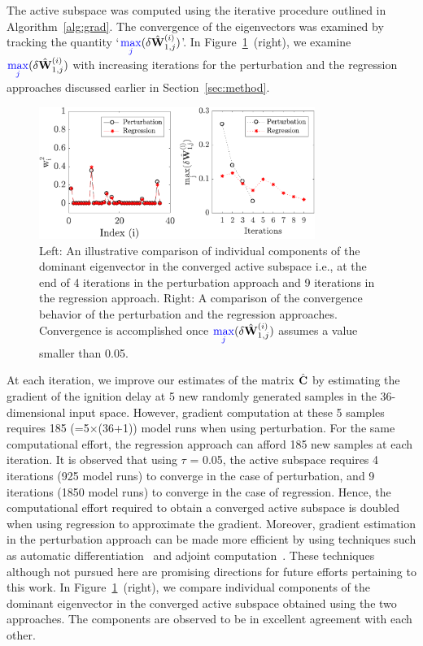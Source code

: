 The active subspace was computed using the iterative procedure outlined in 
Algorithm~\ref{alg:grad}. The convergence of the eigenvectors was examined
by tracking the quantity `${\color{blue}{\max\limits_j}}(\delta \hat{\mathbf{{W}}}_{1,j}^{(i)})$'. 
In Figure~\ref{fig:conv_app}~(right), we examine ${\color{blue}{\max\limits_j}}(\delta \hat{\mathbf{{W}}}_{1,j}^{(i)})$
with increasing iterations for the perturbation and the regression approaches 
discussed earlier in Section~\ref{sec:method}. 
%
\begin{figure}[htbp]
 \begin{center}
  \includegraphics[width=0.8\textwidth]{./Figures/eig_conv36Dp2}
\caption{Left: An illustrative comparison of individual components of the 
dominant eigenvector in the converged active subspace i.e., at the end
of 4 iterations in the perturbation approach and 9 iterations in the
regression approach. Right: A comparison of the convergence behavior
of the perturbation and the
regression approaches. Convergence is accomplished once 
${\color{blue}{\max\limits_j}}(\delta \hat{\mathbf{{W}}}_{1,j}^{(i)})$ assumes a value smaller
than 0.05.}
\label{fig:conv_app}
\end{center}
\end{figure}
%
At each iteration, we improve our estimates of the matrix $\hat{\mathbf{{C}}}$ by
estimating the gradient of the ignition delay at 5 new randomly generated samples 
in the 36-dimensional input space. However, gradient computation at these
5 samples requires 185 (=5$\times$(36+1)) model runs when using perturbation. 
For the same computational effort, the regression approach can afford 185 new
samples at each iteration. It is observed that using $\tau$ = 0.05, the 
active subspace requires 4 iterations (925 model runs) to converge in the case of perturbation, and
9 iterations (1850 model runs) to converge in the case of regression. Hence, the computational effort
required to obtain a converged active subspace is doubled when using
regression to approximate the gradient. Moreover, gradient estimation in the perturbation approach
can be made more efficient by using techniques such as automatic differentiation~\cite{Kiparissides:2009}
and adjoint computation~\cite{Jameson:1988}. These techniques although not pursued here are 
promising directions for
future efforts pertaining to this work. In Figure~\ref{fig:conv_app}~(right), we compare
individual components of the dominant eigenvector in the converged active subspace
obtained using the two approaches. The components are observed to be in excellent
agreement with each other.

